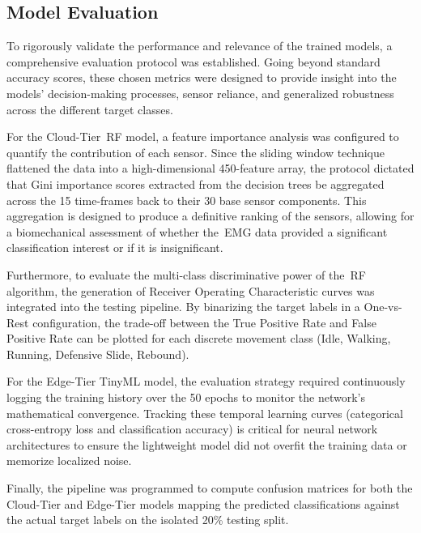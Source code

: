\subsection{Model Evaluation}
\label{ssec:ml_evaluation}

To rigorously validate the performance and relevance of the trained models, a comprehensive evaluation protocol was established. Going beyond standard accuracy scores, these chosen metrics were designed to provide insight into the models' 
decision-making processes, sensor reliance, and generalized robustness across the different target classes.

For the Cloud-Tier~\gls{RF} model, a feature importance analysis was configured to quantify the contribution of each sensor. Since the sliding window technique flattened the data into a high-dimensional 450-feature array, the 
protocol dictated that Gini importance scores extracted from the decision trees be aggregated across the 15 time-frames back to their 30 base sensor components. This aggregation is designed to produce a definitive ranking of the sensors, 
allowing for a biomechanical assessment of whether the~\gls{EMG} data provided a significant classification interest or if it is insignificant.

Furthermore, to evaluate the multi-class discriminative power of the~\gls{RF} algorithm, the generation of Receiver Operating Characteristic curves was integrated into the testing pipeline. By binarizing the target labels in a 
One-vs-Rest configuration, the trade-off between the True Positive Rate and False Positive Rate can be plotted for each discrete movement class (Idle, Walking, Running, Defensive Slide, Rebound).

For the Edge-Tier Tiny\gls{ML} model, the evaluation strategy required continuously logging the training history over the 50 epochs to monitor the network's mathematical convergence. Tracking these temporal learning curves (categorical cross-entropy 
loss and classification accuracy) is critical for neural network architectures to ensure the lightweight model did not overfit the training data or memorize localized noise. 

Finally, the pipeline was programmed to compute confusion matrices for both the Cloud-Tier and Edge-Tier models mapping the predicted classifications against the actual target labels on the isolated 20\% testing split.

